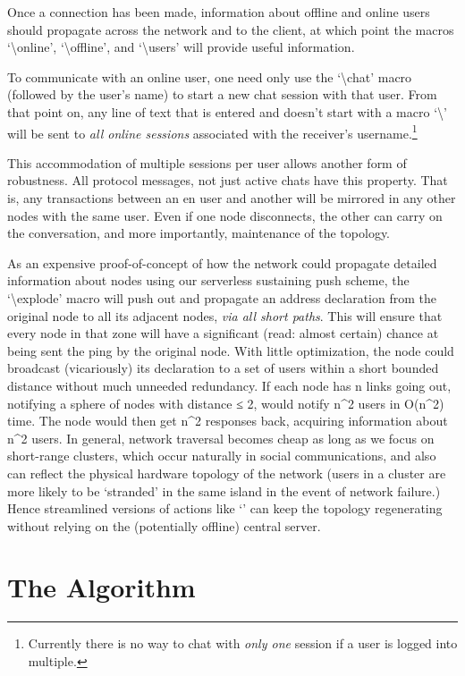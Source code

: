 \documentclass[11pt]{article}
\begin{document}
Once a connection has been made, information about offline and online users should propagate across the network and to the client, at which point the macros `\textbackslash online', `\textbackslash offline', and `\textbackslash users' will provide useful information.

To communicate with an online user, one need only use the `\textbackslash chat' macro (followed by the user's name) to start a new chat session with that user. From that point on, any line of text that is entered and doesn't start with a macro `\textbackslash' will be sent to \emph{all online sessions} associated with the receiver's username.\footnote{Currently there is no way to chat with \emph{only one} session if a user is logged into multiple.}

This accommodation of multiple sessions per user allows another form of robustness. All protocol messages, not just active chats have this property. That is, any transactions between an en user and another will be mirrored in any other nodes with the same user. Even if one node disconnects, the other can carry on the conversation, and more importantly, maintenance of the topology.

As an expensive proof-of-concept of how the network could propagate detailed information about nodes using our serverless sustaining push scheme, the `\textbackslash explode' macro will push out and propagate an address declaration from the original node to all its adjacent nodes, \emph{via all short paths}. This will ensure that every node in that zone will have a significant (read: almost certain) chance at being sent the ping by the original node. With little optimization, the node could broadcast (vicariously) its declaration to a set of users within a short bounded distance without much unneeded redundancy. If each node has n links going out, notifying a sphere of nodes with distance ≤ 2, would notify n^2 users in O(n^2) time. The node would then get n^2 responses back, acquiring information about n^2 users. In general, network traversal becomes cheap as long as we focus on short-range clusters, which occur naturally in social communications, and also can reflect the physical hardware topology of the network (users in a cluster are more likely to be `stranded' in the same island in the event of network failure.) Hence streamlined versions of actions like `\explode' can keep the topology regenerating without relying on the (potentially offline) central server.

\section{The Algorithm}
\end{document}
